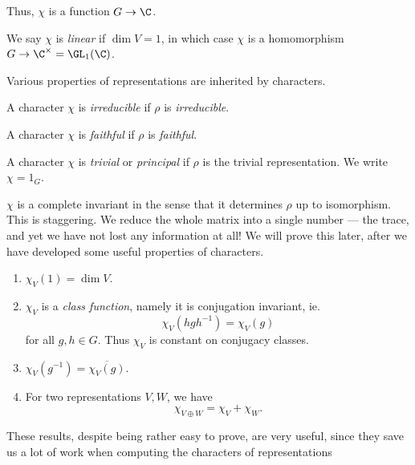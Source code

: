 \documentclass[a4paper]{article}
\begin{document}
Thus, $\chi$ is a function $G \to \C$.
\begin{defi}
  We say $\chi$ is \emph{linear} if $\dim V = 1$, in which case $\chi$ is a homomorphism $G \to \C^\times = \GL_1(\C)$.
\end{defi}

Various properties of representations are inherited by characters.
\begin{defi}
  A character $\chi$ is \emph{irreducible} if $\rho$ is \emph{irreducible}.
\end{defi}

\begin{defi}
  A character $\chi$ is \emph{faithful} if $\rho$ is \emph{faithful}.
\end{defi}

\begin{defi}
  A character $\chi$ is \emph{trivial} or \emph{principal} if $\rho$ is the trivial representation. We write $\chi = 1_G$.
\end{defi}

$\chi$ is a complete invariant in the sense that it determines $\rho$ up to isomorphism. This is staggering. We reduce the whole matrix into a single number --- the trace, and yet we have not lost any information at all! We will prove this later, after we have developed some useful properties of characters.

\begin{thm}\leavevmode
  \begin{enumerate}
    \item $\chi_V(1) = \dim V$.
    \item $\chi_V$ is a \emph{class function}, namely it is conjugation invariant, ie.
      \[
        \chi_V(hgh^{-1}) = \chi_V(g)
      \]
      for all $g, h \in G$. Thus $\chi_V$ is constant on conjugacy classes.
    \item $\chi_V(g^{-1}) = \overline{\chi_V(g)}$.
    \item For two representations $V, W$, we have
      \[
        \chi_{V \oplus W} = \chi_V + \chi_W.
      \]
  \end{enumerate}
\end{thm}
These results, despite being rather easy to prove, are very useful, since they save us a lot of work when computing the characters of representations
\end{document}

